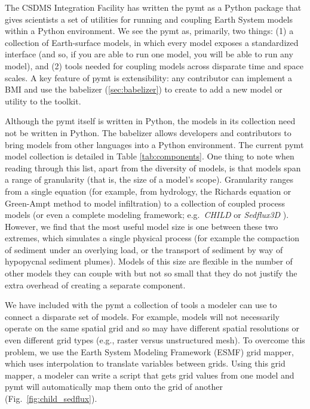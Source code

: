 \documentclass[journal abbreviation, manuscript]{copernicus}
\begin{document}
The CSDMS Integration Facility has written the pymt as a Python package that gives
scientists a set of utilities for running and coupling Earth
System models within a Python environment. We see the pymt
as, primarily, two things:
(1) a collection of Earth-surface models, in which every model exposes
a standardized interface (and so, if you are able to run one model,
you will be able to run any model), and
(2) tools needed for coupling models across disparate time and space scales. 
A key feature of pymt is extensibility: any contributor can implement a BMI and use the babelizer (\ref{sec:babelizer}) to create to add a new model or utility to the toolkit.

Although the pymt itself is written in Python, the models in its
collection need not be written in Python. The babelizer allows developers and contributors to bring 
models from other languages into a Python environment. The current 
pymt model collection is detailed
in Table \ref{tab:components}. One thing to note when reading through
this list, apart from the diversity of models, is that models span a range of granularity (that is, the size of a model's scope). 
Granularity ranges from a single equation
(for example, from hydrology, the Richards equation or Green-Ampt method to model
infiltration) to a collection of coupled process models (or even
a complete modeling framework; e.g.\ \textit{CHILD} \citep{tucker2001channel} or \textit{Sedflux3D} \citep{hutton2008sedflux}). However, we find that the most useful
model size is one between these two extremes, which simulates a single physical process (for example the compaction of sediment under an overlying load, or the transport of sediment by way of hypopycnal sediment plumes). Models of this
size are flexible in the number of other models they can couple with but
not so small that they do not justify the extra overhead of creating a separate
component.



We have included with the pymt a collection of tools a modeler can use to
connect a disparate set of models. For example, models will not
necessarily operate on the same spatial grid and so may have different
spatial resolutions or even different grid types (e.g., raster versus 
unstructured mesh). To overcome this problem, we use
the Earth System Modeling Framework (ESMF) grid mapper, which uses interpolation to translate variables between grids. Using this grid
mapper, a modeler can write a script that gets grid values from
one model and pymt will automatically map them onto the grid of 
another (Fig.~\ref{fig:child_sedflux}).
\end{document}
